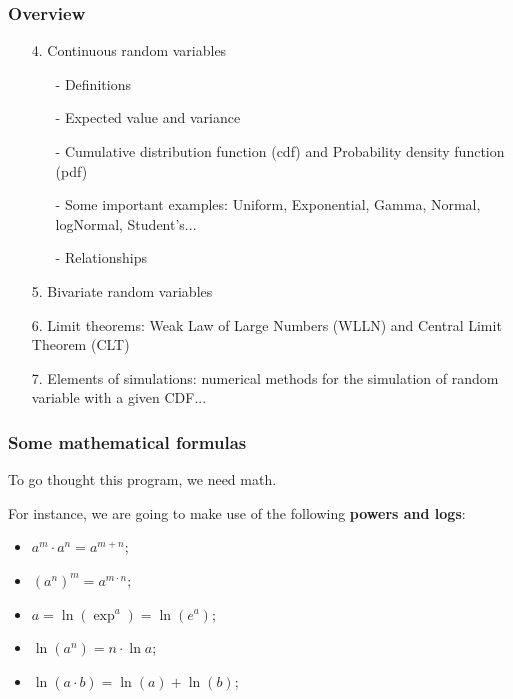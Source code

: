 \documentclass[notes=show,handout]{beamer}
\begin{document}
\begin{frame}
\frametitle{Overview}

\begin{enumerate}
\item[4.]  Continuous random variables

\begin{itemize}
\item[-] Definitions
\item[-] Expected value and variance
\item[-] Cumulative distribution function (cdf) and Probability density function (pdf)
\item[-] Some important examples: Uniform, Exponential, Gamma, Normal, logNormal, Student's...
\item[-] Relationships
\end{itemize}

\item[5.] Bivariate random variables

\item[6.] Limit theorems: Weak Law of Large Numbers (WLLN) and Central Limit Theorem (CLT)

\item[7.] Elements of simulations:  numerical methods for the simulation of random variable with a given CDF...

\end{enumerate}

\end{frame}





\begin{frame}
\frametitle{Some mathematical formulas}

To go thought this program, we need math.

\vspace{0.4cm}

For instance, we are going to make use of the following \textbf{powers and logs}:
\vspace{0.4cm}
\begin{itemize}
\item $a^m \cdot a^n = a^{m+n}$;
\item $(a^n)^m = a^{m \cdot n}$;
\item $a=\ln(\exp^{a}) = \ln(e^a)$;
\item $\ln(a^n) = n \cdot \ln a$;
\item $\ln (a \cdot b) = \ln (a) + \ln (b)$;

\end{itemize}

\end{frame}
\end{document}
